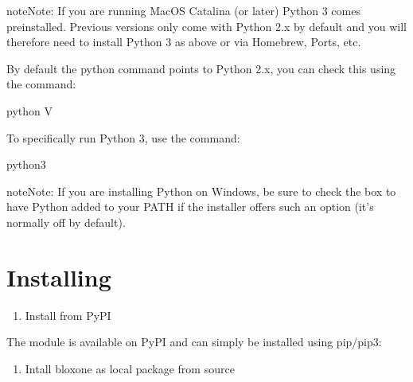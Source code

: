 \documentclass[letterpaper,10pt,english]{sphinxmanual}
\begin{document}
\begin{sphinxadmonition}{note}{Note:}
\sphinxAtStartPar
If you are running MacOS Catalina (or later) Python 3 comes pre\sphinxhyphen{}installed.
Previous versions only come with Python 2.x by default and you will therefore
need to install Python 3 as above or via Homebrew, Ports, etc.

\sphinxAtStartPar
By default the python command points to Python 2.x, you can check this using
the command:

\begin{sphinxVerbatim}[commandchars=\\\{\}]
\PYGZdl{} python \PYGZhy{}V
\end{sphinxVerbatim}

\sphinxAtStartPar
To specifically run Python 3, use the command:

\begin{sphinxVerbatim}[commandchars=\\\{\}]
\PYGZdl{} python3
\end{sphinxVerbatim}
\end{sphinxadmonition}

\begin{sphinxadmonition}{note}{Note:}
\sphinxAtStartPar
If you are installing Python on Windows, be sure to check the box to have
Python added to your PATH if the installer offers such an option
(it’s normally off by default).
\end{sphinxadmonition}


\section{Installing }
\label{\detokenize{installation:installing-bloxone}}\begin{enumerate}
%
\item {} 
\sphinxAtStartPar
Install from PyPI

\end{enumerate}

\sphinxAtStartPar
The  module is available on PyPI and can simply be installed
using pip/pip3:

\begin{sphinxVerbatim}[commandchars=\\\{\}]
   
\end{sphinxVerbatim}
\begin{enumerate}
%
\item {} 
\sphinxAtStartPar
Intall bloxone as local package from source

\end{enumerate}
\end{document}
